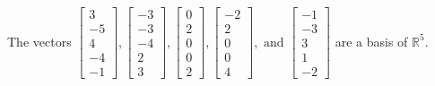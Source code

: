 \begin{exercise}
\begin{exerciseStatement}
  \end{exerciseStatement}
  \begin{exerciseAnswer}
   The vectors \(\left[\begin{array}{r}
3 \\
-5 \\
4 \\
-4 \\
-1
\end{array}\right] , \left[\begin{array}{r}
-3 \\
-3 \\
-4 \\
2 \\
3
\end{array}\right] , \left[\begin{array}{r}
0 \\
2 \\
0 \\
0 \\
2
\end{array}\right] , \left[\begin{array}{r}
-2 \\
2 \\
0 \\
0 \\
4
\end{array}\right] , \text{ and } \left[\begin{array}{r}
-1 \\
-3 \\
3 \\
1 \\
-2
\end{array}\right]\) 
  	 are  a basis of \(\mathbb{R}^5\).
  


  \end{exerciseAnswer}
\end{exercise}